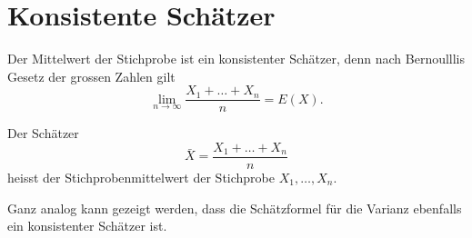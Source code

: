 \section{Konsistente Schätzer}
\label{section-konsistente-schaetzer}
Der Mittelwert der Stichprobe ist ein konsistenter Schätzer,
denn nach Bernoulllis Gesetz der grossen Zahlen gilt
\begin{equation}
\lim_{n\to\infty}\frac{X_1+\dots+X_n}{n}=E(X).
\end{equation}
\begin{definition}
Der Schätzer
\begin{equation}
\bar X=\frac{X_1+\dots+X_n}{n}
\end{equation}
heisst der Stichprobenmittelwert der Stichprobe $X_1,\dots,X_n$.
\end{definition}
Ganz analog kann gezeigt werden, dass die Schätzformel für die
Varianz ebenfalls ein konsistenter Schätzer ist.

